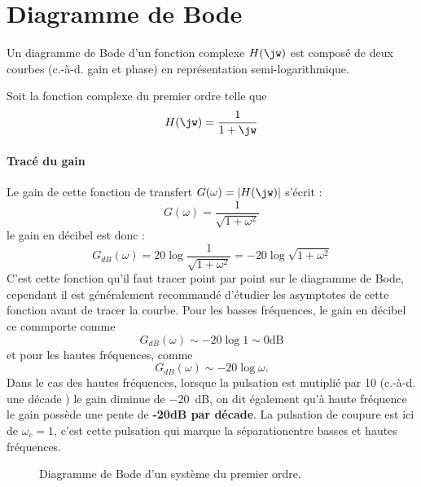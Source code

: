 \section{Diagramme de Bode}
Un diagramme de Bode d'un fonction complexe $H(\jw)$ est composé de deux 
courbes (c.-à-d. gain et phase) en représentation semi-logarithmique.

Soit la fonction complexe du premier ordre telle que 
\begin{align}
    H(\jw)=\dfrac{1}{1+\jw}\label{eq-ft_annexe}
\end{align}
\paragraph{Tracé du gain}
Le gain de cette fonction de transfert $G(\omega)=|H(\jw)|$ s'écrit :
\[
    G(\omega)=\dfrac{1}{\sqrt{1+\omega^2}}
\]
le gain en décibel est donc :
\[
    G_{dB}(\omega)=20\log{\dfrac{1}{\sqrt{1+\omega^2}}}
                  =-20\log{\sqrt{1+\omega^2}}
\]
C'est cette fonction qu'il faut tracer point par point sur le diagramme 
de Bode, cependant il est généralement recommandé d'étudier les asymptotes 
de cette fonction avant de tracer la courbe. Pour les basses fréquences, le 
gain en décibel ce commporte comme 
\[
    G_{dB}(\omega)\sim-20\log{1}\sim 0\text{dB}
\] 
et pour les hautes fréquences, comme
\[
    G_{dB}(\omega)\sim -20\log{\omega}.
\]
Dans le cas des hautes fréquences, lorsque la pulsation est mutiplié par 
10 (c.-à-d. une décade ) le gain diminue de \SI{-20}{\dB}, on dit également 
qu'à haute fréquence le gain possède une pente de \textbf{-20dB par décade}. 
La pulsation de coupure est ici de $\omega_{c}=1$, c'est cette pulsation qui 
marque la \og séparation\fg entre basses et hautes fréquences. 
\begin{figure}[!t]
    \centering
    
    
    \caption{Diagramme de Bode d'un système du premier ordre.
    \label{fig-bode_annexe}}
\end{figure}
